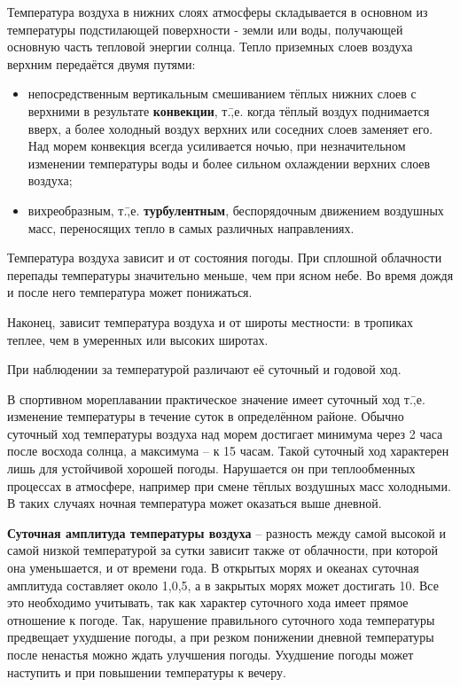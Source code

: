 Температура воздуха в нижних слоях атмосферы складывается в основном
из температуры подстилающей поверхности - земли или воды, получающей
основную часть тепловой энергии солнца. Тепло приземных слоев воздуха
верхним передаётся двумя путями:

\begin{itemize}
\item непосредственным вертикальным смешиванием тёплых нижних слоев с
  верхними в результате \textbf{конвекции}, т.\=,е. когда тёплый
  воздух поднимается вверх, а более холодный воздух верхних или
  соседних слоев заменяет его. Над морем конвекция всегда усиливается
  ночью, при незначительном изменении температуры воды и более сильном
  охлаждении верхних слоев воздуха;
\item вихреобразным, т.\=,е. \textbf{турбулентным}, беспорядочным
  движением воздушных масс, переносящих тепло в самых различных
  направлениях.
\end{itemize}

Температура воздуха зависит и от состояния погоды. При сплошной
облачности перепады температуры значительно меньше, чем при ясном
небе. Во время дождя и после него температура может понижаться.

Наконец, зависит температура воздуха и от широты местности: в тропиках
теплее, чем в умеренных или высоких широтах.

При наблюдении за температурой различают её суточный и годовой ход.

В спортивном мореплавании практическое значение имеет суточный ход
т.\=,е. изменение температуры в течение суток в определённом
районе. Обычно суточный ход температуры воздуха над морем достигает
минимума через 2 часа после восхода солнца, а максимума \--- к
15 часам. Такой суточный ход характерен лишь для устойчивой
хорошей погоды. Нарушается он при теплообменных процессах в атмосфере,
например при смене тёплых воздушных масс холодными. В таких случаях
ночная температура может оказаться выше дневной.

\textbf{Суточная амплитуда температуры
  воздуха} \--- разность между
самой высокой и самой низкой температурой за сутки зависит также от
облачности, при которой она уменьшается, и от времени года. В открытых
морях и океанах суточная амплитуда составляет около 1,0,5\grC,
а в закрытых морях может достигать 10\grC. Все это необходимо
учитывать, так как характер суточного хода имеет прямое отношение к
погоде. Так, нарушение правильного суточного хода температуры
предвещает ухудшение погоды, а при резком понижении дневной
температуры после ненастья можно ждать улучшения погоды. Ухудшение
погоды может наступить и при повышении температуры к вечеру.

